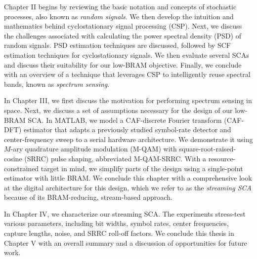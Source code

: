 Chapter II begins by reviewing the basic notation and concepts of stochastic processes, also known as \textit{random signals}.  We then develop the intuition and mathematics behind cyclostationary signal processing (CSP).  Next, we discuss the challenges associated with calculating the power spectral density (PSD) of random signals.  PSD estimation techniques are discussed, followed by SCF estimation techniques for cyclostationary signals.  We then evaluate several SCAs and discuss their suitability for our low-BRAM objective.  Finally, we conclude with an overview of a technique that leverages CSP to intelligently reuse spectral bands, known as \textit{spectrum sensing}.

In Chapter III, we first discuss the motivation for performing spectrum sensing in space.  Next, we discuss a set of assumptions necessary for the design of our low-BRAM SCA.  In MATLAB, we model a CAF-discrete Fourier transform (CAF-DFT) estimator that adapts a previously studied symbol-rate detector and center-frequency sweep to a serial hardware architecture.  We demonstrate it using $M$-ary quadrature amplitude modulation (M-QAM) with square-root-raised-cosine (SRRC) pulse shaping, abbreviated M-QAM-SRRC.  With a resource-constrained target in mind, we simplify parts of the design using a single-point estimator with little BRAM.  We conclude this chapter with a comprehensive look at the digital architecture for this design, which we refer to as the \textit{streaming SCA} because of its BRAM-reducing, stream-based approach.

In Chapter IV, we characterize our streaming SCA.  The experiments stress-test various parameters, including bit widths, symbol rates, center frequencies, capture lengths, noise, and SRRC roll-off factors.  We conclude this thesis in Chapter V with an overall summary and a discussion of opportunities for future work.


\clearpage
